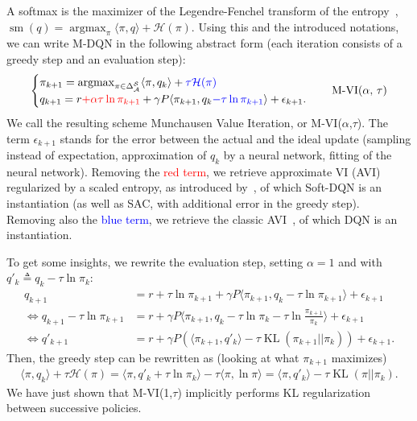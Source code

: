 \documentclass{article}
\newcommand{\h}{\mathcal{H}}
\DeclareMathOperator*{\argmax}{argmax}
\DeclareMathOperator*{\softmax}{sm}
\DeclareMathOperator{\kl}{KL}
\newcommand{\states}{\mathcal{S}}
\newcommand{\actions}{\mathcal{A}}
\begin{document}
A softmax is the maximizer of the Legendre-Fenchel transform of the entropy~\cite{boyd2004convex,vieillard2020leverage}, $\softmax(q) = \argmax_{\pi}\langle \pi, q\rangle + \h(\pi)$. Using this and the introduced notations, we can write M-DQN in the following abstract form (each iteration consists of a greedy step and an evaluation step):
\begin{equation}
\label{eq:munchvi}
\begin{cases}
    \pi_{k+1} = \argmax_{\pi\in\Delta_\actions^\states}\langle\pi, q_k\rangle + \textcolor{blue}{\tau\mathcal{H}(\pi)}
    \\
    q_{k+1} = r \textcolor{red}{+ \alpha\tau\ln\pi_{k+1}} + \gamma P\langle\pi_{k+1}, q_k \textcolor{blue}{- \tau \ln \pi_{k+1}}\rangle  +  \epsilon_{k+1}.
\end{cases} \quad\text{M-VI($\alpha$, $\tau$)}
\end{equation}
We call the resulting scheme Munchausen Value Iteration, or M-VI($\alpha$,$\tau$). The term $\epsilon_{k+1}$ stands for the error between the actual and the ideal update (sampling instead of expectation, approximation of $q_k$ by a neural network, fitting of the neural network). Removing the \textcolor{red}{red term}, we retrieve approximate VI (AVI) regularized by a scaled entropy, as introduced by~\citet{geist2019theory}, of which Soft-DQN is an instantiation (as well as SAC, with additional error in the greedy step). Removing also the \textcolor{blue}{blue term}, we retrieve the classic AVI~\cite{scherrer2015approximate}, of which DQN is an instantiation.

To get some insights, we rewrite the evaluation step, setting $\alpha=1$ and with $q'_k \triangleq q_k - \tau \ln \pi_k$:
\begin{align}
    q_{k+1} &= r + \tau\ln\pi_{k+1} + \gamma P\langle\pi_{k+1}, q_k - \tau \ln \pi_{k+1}\rangle  +  \epsilon_{k+1}
    \\ \Leftrightarrow
    q_{k+1} - \tau\ln\pi_{k+1} &= r + \gamma P\langle\pi_{k+1}, q_k - \tau\ln\pi_k - \tau \ln \frac{\pi_{k+1}}{\pi_k}\rangle  +  \epsilon_{k+1}
    \\ \Leftrightarrow 
    q'_{k+1} &= r + \gamma P(\langle\pi_{k+1}, q'_k \rangle - \tau \kl(\pi_{k+1}||\pi_k)) + \epsilon_{k+1}.
\end{align}
Then, the greedy step can be rewritten as (looking at what $\pi_{k+1}$ maximizes)\begin{align}
\label{eq:greedy-step-inline}
    \langle \pi, q_k\rangle + \tau\h(\pi)
    = \langle \pi, q'_k + \tau \ln \pi_k \rangle - \tau\langle\pi,\ln\pi\rangle
    = \langle \pi, q'_k \rangle - \tau \kl(\pi||\pi_k).
\end{align}
We have just shown that M-VI(1,$\tau$) implicitly performs KL regularization between successive policies. 
\end{document}
